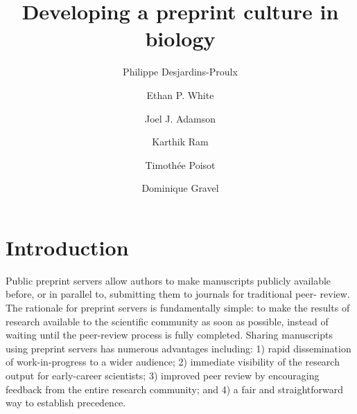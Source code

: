 \documentclass[letterpaper,twocolumn,superscriptaddress,showkeys,longbibliography]{revtex4-1}
\begin{document}
\title{Developing a preprint culture in biology}

\author{Philippe Desjardins-Proulx}

\author{Ethan P. White}

\author{Joel J. Adamson}

\author{Karthik Ram}

\author{Timoth\'ee Poisot}

\author{Dominique Gravel}


\maketitle

\section{Introduction}

Public preprint servers allow authors to make manuscripts publicly available
before, or in parallel to, submitting them to journals for traditional peer-
review. The rationale for preprint servers is fundamentally simple: to make
the results of research available to the scientific community as
soon as possible, instead of waiting until the peer-review process is fully
completed.  Sharing manuscripts using preprint servers has numerous advantages
including: 1) rapid dissemination of work-in-progress to a wider audience; 2)
immediate visibility of the research output for early-career scientists; 3)
improved peer review by encouraging feedback from the entire research
community; and 4) a fair and straightforward way to establish precedence.
\end{document}
